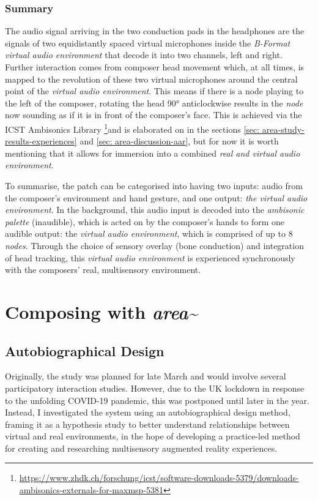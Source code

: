 \subsubsection{Summary}\label{sec: area-system-software-summary}
The audio signal arriving in the two conduction pads in the headphones are the signals of two equidistantly spaced virtual microphones inside the \textit{B-Format virtual audio environment} that decode it into two channels, left and right. Further interaction comes from composer head movement which, at all times, is mapped to the revolution of these two virtual microphones around the central point of the \textit{virtual audio environment}. This means if there is a node playing to the left of the composer, rotating the head 90° anticlockwise results in the \textit{node} now sounding as if it is in front of the composer's face. This is achieved via the ICST Ambisonics Library \citep{schacher2006} \footnote{\url{https://www.zhdk.ch/forschung/icst/software-downloads-5379/downloads-ambisonics-externals-for-maxmsp-5381}}and is elaborated on in the sections \autoref{sec: area-study-results-experiences} and \autoref{sec: area-discussion-aar}, but for now it is worth mentioning that it allows for immersion into a combined \textit{real and virtual audio environment}.

To summarise, the patch can be categorised into having two inputs: audio from the composer's environment and hand gesture, and one output: \textit{the virtual audio environment}. In the background, this audio input is decoded into the \textit{ambisonic palette} (inaudible), which is acted on by the composer's hands to form one audible output: the \textit{virtual audio environment}, which is comprised of up to 8 \textit{nodes}. Through the choice of sensory overlay (bone conduction) and integration of head tracking, this \textit{virtual audio environment} is experienced synchronously with the composers' real, multisensory environment. 



\section{Composing with \textit{area\textasciitilde{}}}\label{sec: area-study}
\subsection{Autobiographical Design}\label{sec: area-study-abd}
Originally, the study was planned for late March and would involve several participatory interaction studies. However, due to the UK lockdown in response to the unfolding COVID-19 pandemic, this was postponed until later in the year. Instead, I investigated the system using an autobiographical design method, framing it as a hypothesis study to better understand relationships between virtual and real environments, in the hope of developing a practice-led method for creating and researching multisensory augmented reality experiences. 

